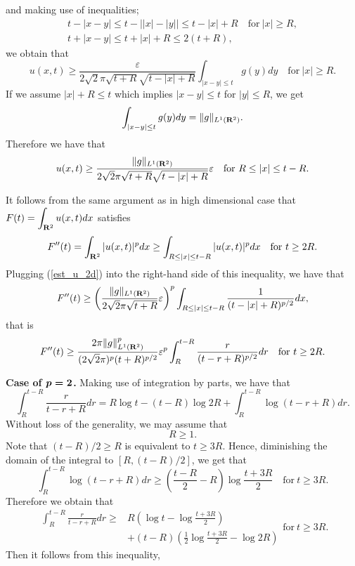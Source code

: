 \documentclass[a4paper,12pt]{article}
\numberwithin{equation}{section}
\def\R{{\bf R}}
\def\d{\displaystyle}
\def\e{{\varepsilon}}
\def\v#1{\mbox{\boldmath $#1$}}
\begin{document}
and making use of inequalities;
\[
\begin{array}{l}
t-|x-y|\le t-\left||x|-|y|\right|\le t-|x|+R\quad\mbox{for}\ |x|\ge R,\\
t+|x-y|\le t+|x|+R\le2(t+R),
\end{array}
\]
we obtain that
\[
u(x,t)\ge\frac{\e}{2\sqrt{2}\pi\sqrt{t+R}\sqrt{t-|x|+R}}\int_{|x-y|\le t}g(y)dy
\quad\mbox{for}\ |x|\ge R.
\]
If we assume $|x|+R\le t$ which implies $|x-y|\le t$ for $|y|\le R$,
we get
\[
\int_{|x-y|\le t}g(y)dy=\|g\|_{L^1(\R^2)}.
\]
Therefore we have that
\begin{equation}
\label{est_u_2d}
 u(x,t)\ge\frac{\|g\|_{L^1(\R^2)}}{2\sqrt{2}\pi\sqrt{t+R}\sqrt{t-|x|+R}}\e
\quad\mbox{for}\ R\le|x|\le t-R.
\end{equation}
\par
It follows from the same argument as in high dimensional case that $\d F(t)=\int_{\R^2}u(x,t)dx$ satisfies
\[
F''(t)=\int_{\R^2}|u(x,t)|^pdx
\ge\int_{R\le|x|\le t-R}|u(x,t)|^pdx\quad\mbox{for}\ t\ge2R.
\]
Plugging (\ref{est_u_2d}) into the right-hand side of this inequality, we have that
\[ 
F''(t)\ge\left(\frac{\|g\|_{L^1(\R^2)}}{2\sqrt{2}\pi\sqrt{t+R}}\e\right)^p
\int_{R\le|x|\le t-R}\frac{1}{(t-|x|+R)^{p/2}}dx,
\]
that is
\begin{equation}
\label{est_F''_2d}
F''(t)\ge\frac{2\pi\|g\|^p_{L^1(\R^2)}}{(2\sqrt{2}\pi)^p(t+R)^{p/2}}\e^p
\int_R^{t-R}\frac{r}{(t-r+R)^{p/2}}dr
\quad\mbox{for}\ t\ge2R.
\end{equation}
\par\noindent
{\bf Case of $\v{p=2}$.} Making use of integration by parts, we have that
\[
\int_R^{t-R}\frac{r}{t-r+R}dr
=R\log t-(t-R)\log2R+\int_R^{t-R}\log(t-r+R)dr.
\]
Without loss of the generality, we may assume that
\begin{equation}
\label{R}
R\ge1.
\end{equation}
Note that $(t-R)/2\ge R$ is equivalent to $t\ge3R$.
Hence, diminishing the domain of the integral to $[R,(t-R)/2]$, we get that
\[
 \int_R^{t-R}\log(t-r+R)dr
\ge\left(\frac{t-R}{2}-R\right)\log\frac{t+3R}{2}
\quad\mbox{for}\ t\ge3R.
\]
Therefore we obtain that
\[
\begin{array}{ll}
\d\int_R^{t-R}\frac{r}{t-r+R}dr\ge
&\d R\left(\log t-\log\frac{t+3R}{2}\right)\\
&\d +(t-R)\left(\frac{1}{2}\log\frac{t+3R}{2}-\log2R\right)
\end{array}
\mbox{for}\ t\ge3R.
\]
Then it follows from this inequality,
\end{document}
